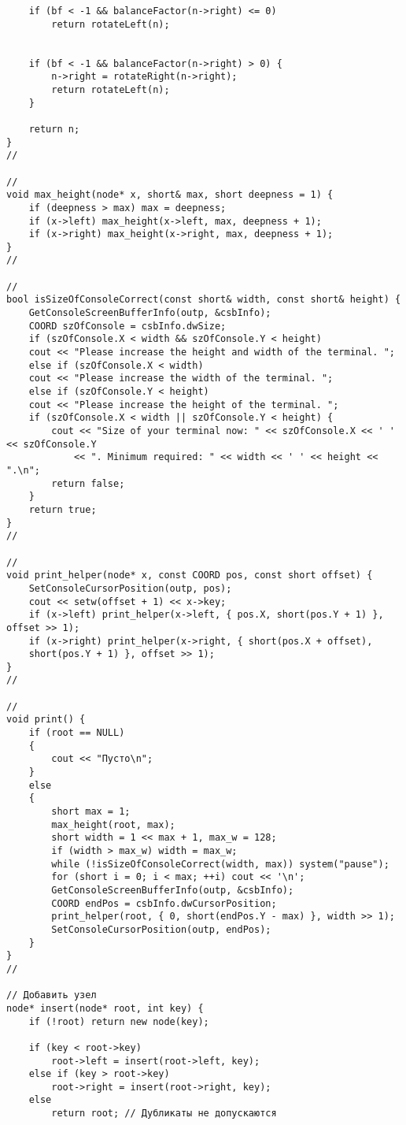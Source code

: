 \documentclass[bachelor, och, referat, times]{SCWorks}
\begin{document}
\begin{verbatim}
    if (bf < -1 && balanceFactor(n->right) <= 0)
        return rotateLeft(n);


    if (bf < -1 && balanceFactor(n->right) > 0) {
        n->right = rotateRight(n->right);
        return rotateLeft(n);
    }

    return n;
}
//

//
void max_height(node* x, short& max, short deepness = 1) {
    if (deepness > max) max = deepness;
    if (x->left) max_height(x->left, max, deepness + 1);
    if (x->right) max_height(x->right, max, deepness + 1);
}
//

//
bool isSizeOfConsoleCorrect(const short& width, const short& height) {
    GetConsoleScreenBufferInfo(outp, &csbInfo);
    COORD szOfConsole = csbInfo.dwSize;
    if (szOfConsole.X < width && szOfConsole.Y < height) 
    cout << "Please increase the height and width of the terminal. ";
    else if (szOfConsole.X < width) 
    cout << "Please increase the width of the terminal. ";
    else if (szOfConsole.Y < height) 
    cout << "Please increase the height of the terminal. ";
    if (szOfConsole.X < width || szOfConsole.Y < height) {
        cout << "Size of your terminal now: " << szOfConsole.X << ' ' << szOfConsole.Y
            << ". Minimum required: " << width << ' ' << height << ".\n";
        return false;
    }
    return true;
}
//

//
void print_helper(node* x, const COORD pos, const short offset) {
    SetConsoleCursorPosition(outp, pos);
    cout << setw(offset + 1) << x->key;
    if (x->left) print_helper(x->left, { pos.X, short(pos.Y + 1) }, offset >> 1);
    if (x->right) print_helper(x->right, { short(pos.X + offset), 
    short(pos.Y + 1) }, offset >> 1);
}
//

//
void print() {
    if (root == NULL) 
    {
        cout << "Пусто\n";
    }
    else
    {
        short max = 1;
        max_height(root, max);
        short width = 1 << max + 1, max_w = 128;
        if (width > max_w) width = max_w;
        while (!isSizeOfConsoleCorrect(width, max)) system("pause");
        for (short i = 0; i < max; ++i) cout << '\n';
        GetConsoleScreenBufferInfo(outp, &csbInfo);
        COORD endPos = csbInfo.dwCursorPosition;
        print_helper(root, { 0, short(endPos.Y - max) }, width >> 1);
        SetConsoleCursorPosition(outp, endPos);
    }
}
//

// Добавить узел
node* insert(node* root, int key) {
    if (!root) return new node(key);

    if (key < root->key)
        root->left = insert(root->left, key);
    else if (key > root->key)
        root->right = insert(root->right, key);
    else
        return root; // Дубликаты не допускаются


\end{verbatim}
\end{document}
